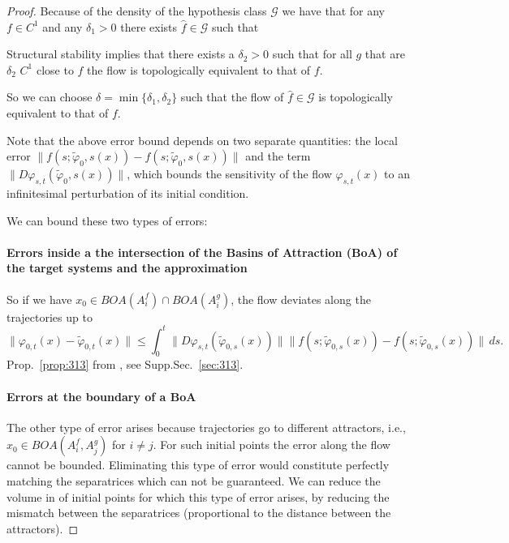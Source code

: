 \documentclass{article}
\theoremstyle{definition}
\theoremstyle{remark}
\begin{document}
\begin{proof}
Because of the density of the hypothesis class $\mathcal{G}$ we have that for any $f\in C^1$ and any $\delta_1>0$
there exists $\hat f\in\mathcal{G}$ such that 


Structural stability implies that there exists a $\delta_2>0$ such that for all $g$ that are $\delta_2$ $C^1$ close to $f$ the flow is topologically equivalent to that of $f$.

So we can choose $\delta = \min\{\delta_1,\delta_2\}$ such that the flow of $\hat f\in\mathcal{G}$ is topologically equivalent to that of $f$.


Note that the above error bound depends on two separate quantities: the local error 
$\| f(s; \tilde{\varphi}_0, s(x)) - f(s; \tilde{\varphi}_0, s(x)) \|$ 
 and the term 
$\| D\varphi_{s,t}(\tilde{\varphi}_0, s(x)) \|$, 
which bounds the sensitivity of the flow $\varphi_{s,t}(x)$ to an infinitesimal perturbation of its initial condition.



We can bound these two types of errors:%
\paragraph{Errors inside a the intersection of the Basins of Attraction (BoA) of the target systems and the approximation}
So if we have $x_0\in BOA(A_i^f) \cap BOA(A_i^g)$, the flow deviates along the trajectories up to 
\[
\|\varphi_{0,t}(x) - \tilde{\varphi}_{0,t}(x)\| \leq \int_0^t \|D\varphi_{s,t}(\tilde{\varphi}_{0,s}(x))\| \|f(s; \tilde{\varphi}_{0,s}(x)) - f(s; \tilde{\varphi}_{0,s}(x))\| \, ds.
\]
Prop.~\ref{prop:313} from \citep{vanhandel2007filtering}, see Supp.Sec.~\ref{sec:313}.





\paragraph{Errors at the boundary of a BoA}%
The other type of error arises because trajectories go to different attractors, i.e., $x_0\in BOA(A_i^f,A_j^g)$ for $i\neq j$.
For such initial points the error along the flow cannot be bounded.
Eliminating this type of error would constitute perfectly matching the separatrices which can not be guaranteed.
We can reduce the volume in of initial points for which this type of error arises, by reducing the mismatch between the separatrices (proportional to the distance between the attractors).


\end{proof}
\end{document}
